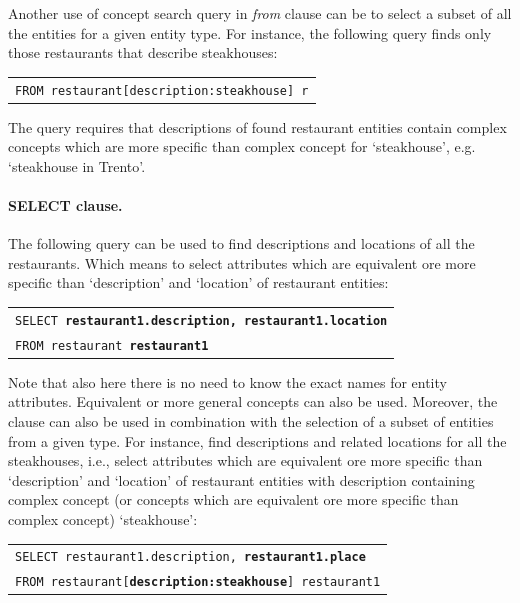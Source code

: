 Another use of concept search query in \emph{from} clause can be to select a subset of all the entities for a given entity type. For instance, the following query finds only those restaurants that describe steakhouses:
\begin{center}
\begin{tabular}{l}
\texttt{FROM restaurant[description:steakhouse] r} \\
\end{tabular}
\end{center}
The query requires that descriptions of found restaurant entities contain complex concepts which are more specific than complex concept for `steakhouse', e.g. `steakhouse in Trento'.

\paragraph{SELECT clause.} 
The following query can be used to find descriptions and locations of all the restaurants. Which means to select attributes which are equivalent ore more specific than `description' and `location' of restaurant entities:
\begin{center}
\begin{tabular}{l}
\texttt{SELECT \textbf{restaurant1.description, restaurant1.location}} \\
\texttt{FROM restaurant \textbf{restaurant1}} \\
\end{tabular}
\end{center}
Note that also here there is no need to know the exact names for entity attributes. Equivalent or more general concepts can also be used. Moreover,
the clause can also be used in combination with the selection of a subset of entities from a given type. For instance, find descriptions and related locations for all the steakhouses, i.e., select attributes which are equivalent ore more specific than `description' and `location' of restaurant entities with description containing complex concept (or concepts which are equivalent ore more specific than complex concept) `steakhouse':
\begin{center}
\begin{tabular}{l}
\texttt{SELECT restaurant1.description, \textbf{restaurant1.place}} \\ 
\texttt{FROM restaurant[\textbf{description:steakhouse}] restaurant1} \\
\end{tabular}
\end{center}

